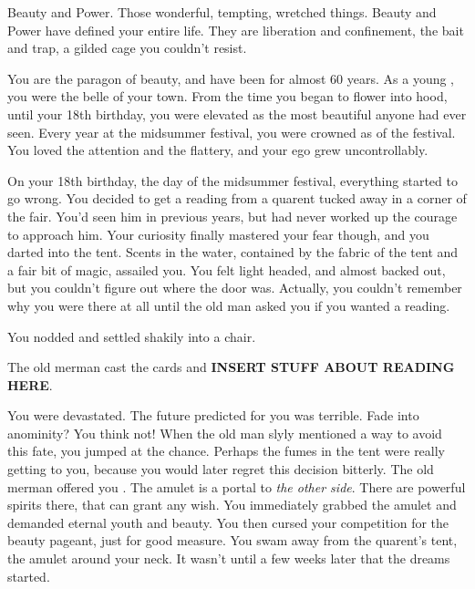 \documentclass[char]{NeptuneBall}
\begin{document}
\name{\cWitch{}}




Beauty and Power. Those wonderful, tempting, wretched things. Beauty and Power have defined your entire life. They are liberation and confinement, the bait and trap, a gilded cage you couldn't resist.

You are the paragon of beauty, and have been for almost 60 years. As a young \cWitch{\mer}, you were the belle of your town. From the time you began to flower into \cWitch{\human}hood, until your 18th birthday, you were elevated as the most beautiful \cWitch{\mer} anyone had ever seen. Every year at the midsummer festival, you were crowned as \cWitch{\King} of the festival. You loved the attention and the flattery, and your ego grew uncontrollably.

On your 18th birthday, the day of the midsummer festival, everything started to go wrong. You decided to get a reading from a quarent tucked away in a corner of the fair. You'd seen him in previous years, but had never worked up the courage to approach him. Your curiosity finally mastered your fear though, and you darted into the tent. Scents in the water, contained by the fabric of the tent and a fair bit of magic, assailed you. You felt light headed, and almost backed out, but you couldn't figure out where the door was. Actually, you couldn't remember why you were there at all until the old man asked you if you wanted a reading.

You nodded and settled shakily into a chair.

The old merman cast the cards and {\bf INSERT STUFF ABOUT READING HERE}.

You were devastated. The future predicted for you was terrible. Fade into anominity? You think not! When the old man slyly mentioned a way to avoid this fate, you jumped at the chance. Perhaps the fumes in the tent were really getting to you, because you would later regret this decision bitterly. The old merman offered you \iAmulet{\MYname}. The amulet is a portal to \emph{the other side}. There are powerful spirits there, that can grant any wish. You immediately grabbed the amulet and demanded eternal youth and beauty. You then cursed your competition for the beauty pageant, just for good measure. You swam away from the quarent's tent, the amulet around your neck. It wasn't until a few weeks later that the dreams started.
\end{document}
